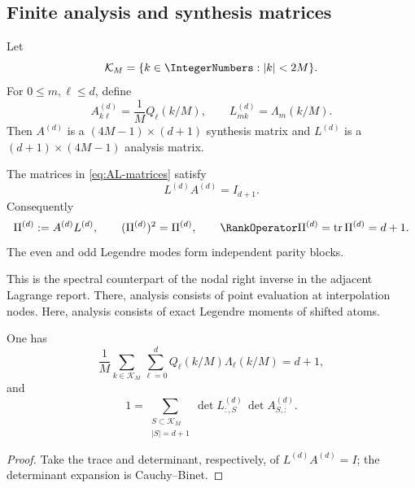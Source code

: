 \documentclass[11pt,oneside]{article}
\numberwithin{equation}{section}
\theoremstyle{definition}
\theoremstyle{remark}
\newcommand{\tr}{\operatorname{tr}}
\begin{document}
\subsection{Finite analysis and synthesis matrices}

Let
\[
 \mathcal K_M=\{k\in\IntegerNumbers:|k|<2M\}.
\]
For $0\le m,\ell\le d$, define
\begin{equation}
 A^{(d)}_{k\ell}=\frac1M Q_\ell(k/M),
 \qquad
 L^{(d)}_{mk}=\Lambda_m(k/M).
 \label{eq:AL-matrices}
\end{equation}
Then $A^{(d)}$ is a $(4M-1)\times(d+1)$ synthesis matrix and $L^{(d)}$ is a
$(d+1)\times(4M-1)$ analysis matrix.

\begin{corollary}
\label{cor:spectral-projector}
The matrices in \eqref{eq:AL-matrices} satisfy
\begin{equation}
 \boxed{L^{(d)}A^{(d)}=I_{d+1}.}
 \label{eq:LA-I}
\end{equation}
Consequently
\begin{equation}
 \Pi^{(d)}:=A^{(d)}L^{(d)},
 \qquad
 (\Pi^{(d)})^2=\Pi^{(d)},
 \qquad
 \RankOperator\Pi^{(d)}=\tr\Pi^{(d)}=d+1.
 \label{eq:spectral-projector}
\end{equation}
The even and odd Legendre modes form independent parity blocks.
\end{corollary}

This is the spectral counterpart of the nodal right inverse in the adjacent
Lagrange report.  There, analysis consists of point evaluation at interpolation
nodes.  Here, analysis consists of exact Legendre moments of shifted atoms.

\begin{corollary}
\label{cor:trace-cauchy-binet}
One has
\begin{equation}
 \frac1M\sum_{k\in\mathcal K_M}
 \sum_{\ell=0}^{d}Q_\ell(k/M)\Lambda_\ell(k/M)=d+1,
 \label{eq:trace-identity}
\end{equation}
and
\begin{equation}
 1=\sum_{\substack{S\subset\mathcal K_M\\|S|=d+1}}
 \det L^{(d)}_{:,S}\,\det A^{(d)}_{S,:}.
 \label{eq:spectral-cauchy-binet}
\end{equation}
\end{corollary}

\begin{proof}
Take the trace and determinant, respectively, of
$L^{(d)}A^{(d)}=I$; the determinant expansion is Cauchy--Binet.
\end{proof}
\end{document}
